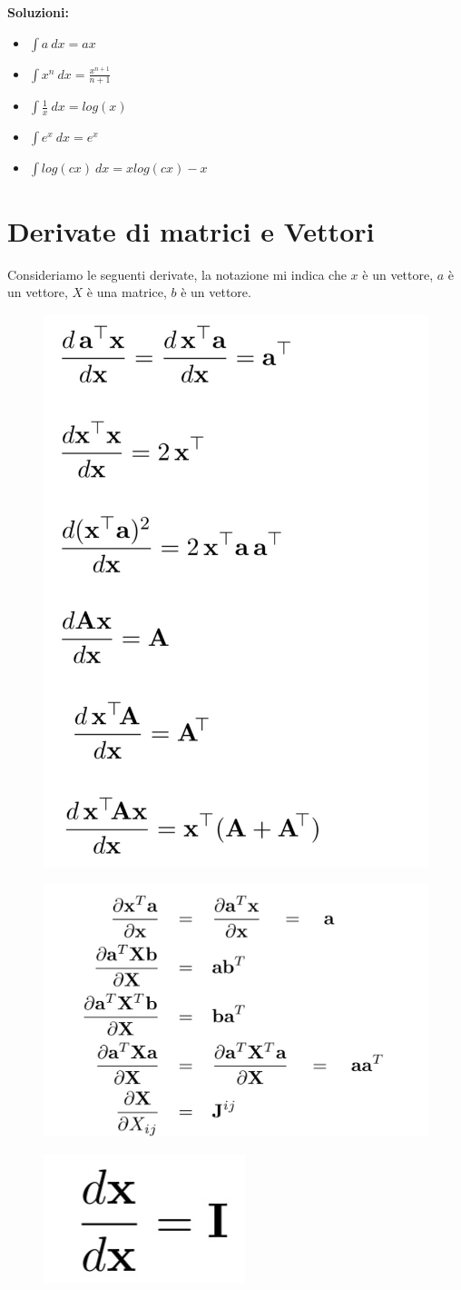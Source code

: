 \documentclass[14pt]{extreport}
\begin{document}
\textbf{Soluzioni:}

\begin{itemize}
\item $\int a \ dx =ax$
\item $\int x^n \ dx= \frac{x^{n+1}}{n+1}$
\item $\int \frac{1}{x} \ dx= log(x)$
\item $\int e^x\ dx= e^x$
\item $\int log(cx)\ dx= xlog(cx) - x$
\end{itemize}

\section{Derivate di matrici e Vettori}

Consideriamo le seguenti derivate, la notazione mi indica che $x$ è un vettore, $a$ è un vettore, $X$ è una matrice, $b$ è un vettore.

\begin{figure}[H]
\centering
\includegraphics[width=0.4\linewidth]{71.jpeg}
\end{figure}
\begin{figure}[H]
\centering
\includegraphics[width=0.7\linewidth]{73.jpeg}
\end{figure}
\begin{figure}[H]
\centering
\includegraphics[width=0.2\linewidth]{72.jpeg}
\end{figure}
\end{document}
